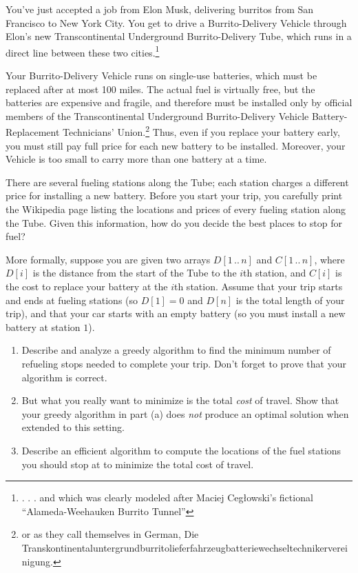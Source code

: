 \begin{exercises}
\item You’ve just accepted a job from Elon Musk, delivering burritos from San Francisco to New York City. You get to drive a Burrito-Delivery Vehicle through Elon’s new Transcontinental Underground Burrito-Delivery Tube, which runs in a direct line between these two cities.\footnote{. . . and which was clearly modeled after Maciej Cegłowski’s fictional “Alameda-Weehauken Burrito Tunnel”}

Your Burrito-Delivery Vehicle runs on single-use batteries, which must be replaced after at most 100 miles. The actual fuel is virtually free, but the batteries are expensive and fragile, and therefore must be installed only by official members of the Transcontinental Underground Burrito-Delivery Vehicle Battery-Replacement Technicians’ Union.\footnote{or as they call themselves in German, Die Transkontinentaluntergrundburritolieferfahrzeugbatteriewechseltechnikervereinigung.} Thus, even if you replace your battery early, you must still pay full price for each new battery to be installed. Moreover, your Vehicle is too small to carry more than one battery at a time.

There are several fueling stations along the Tube; each station charges a different price for installing a new battery. Before you start your trip, you carefully print the Wikipedia page listing the locations and prices of every fueling station along the Tube. Given this information, how do you decide the best places to stop for fuel?

More formally, suppose you are given two arrays $D[1\,..\,n]$ and $C[1\,..\,n]$, where $D[i]$ is the distance from the start of the Tube to the $i$th station, and $C[i]$ is the cost to replace your battery at the $i$th station. Assume that your trip starts and ends at fueling stations (so $D[1] = 0$ and $D[n]$ is the total length of your trip), and that your car starts with an empty battery (so you must install a new battery at station $1$).
\begin{enumerate}[label=(\alph*)]
\item Describe and analyze a greedy algorithm to find the minimum number of refueling stops needed to complete your trip. Don’t forget to prove that your algorithm is correct.
\item But what you really want to minimize is the total \textit{cost} of travel. Show that your greedy algorithm in part (a) does \textit{not} produce an optimal solution when extended to this setting.
\item Describe an efficient algorithm to compute the locations of the fuel stations you should stop at to minimize the total cost of travel.
\end{enumerate}


\end{exercises}
